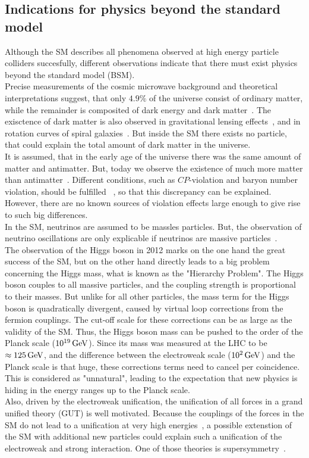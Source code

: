 \subsection{Indications for physics beyond the standard model}\label{sec:SM_bsm}
Although the SM describes all phenomena observed at high energy particle colliders succesfully, different observations indicate that there must exist physics beyond the standard model (BSM).\\
Precise measurements of the cosmic microwave background and theoretical interpretations suggest, that only $4.9\%$ of the universe consist of ordinary matter, while the remainder is composited of dark energy and dark matter~\cite{DarkMatterPlanck}. The exisctence of dark matter is also observed in gravitational lensing effects~\cite{DarkMatterLensing}, and in rotation curves of spiral galaxies~\cite{DarkMatterRotation}. But inside the SM there exists no particle, that could explain the total amount of dark matter in the universe.\\
It is assumed, that in the early age of the universe there was the same amount of matter and antimatter. But, today we observe the existence of much more matter than antimatter~\cite{Antimatter,AsymSM}. Different conditions, such as $CP$-violation and baryon number violation, should be fulfilled ~\cite{Sakharov}, so that this discrepancy can be explained. However, there are no known sources of violation effects large enough to give rise to such big differences.\\
In the SM, neutrinos are assumed to be massles particles. But, the observation of neutrino oscillations are only explicable if neutrinos are massive particles~\cite{NeutrinoMass,PDG}.\\
The observation of the Higgs boson in 2012 marks on the one hand the great success of the SM, but on the other hand directly leads to a big problem concerning the Higgs mass, what is known as the "Hierarchy Problem". The Higgs boson couples to all massive particles, and the coupling strength is proportional to their masses. But unlike for all other particles, the mass term for the Higgs boson is quadratically divergent, caused by virtual loop corrections from the fermion couplings. The cut-off scale for these corrections can be as large as the validity of the SM. Thus, the Higgs boson mass can be pushed to the order of the Planck scale ($10^{19}\,\text{Ge\hspace{-.08em}V}$). Since its mass was measured at the LHC to be $\approx 125\,\text{Ge\hspace{-.08em}V}$, and the difference between the electroweak scale ($10^2\,\text{Ge\hspace{-.08em}V}$) and the Planck scale is that huge, these corrections terms need to cancel per coincidence. This is considered as "unnatural", leading to the expectation that new physics is hiding in the energy ranges up to the Planck scale.\\
Also, driven by the electroweak unification, the unification of all forces in a grand unified theory (GUT) is well motivated. Because the couplings of the forces in the SM do not lead to a unification at very high energies~\cite{PDG}, a possible extenstion of the SM with additional new particles could explain such a unification of the electroweak and strong interaction. One of those theories is supersymmetry~\cite{SUSYOriginal}.


